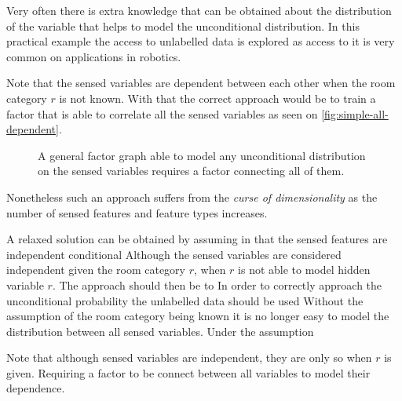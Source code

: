 Very often there is extra knowledge that can be obtained about the distribution
of the variable that helps to model the unconditional distribution.
In this practical example the access to unlabelled data is explored as access to
it is very common on applications in robotics.

Note that the sensed variables are dependent between each other when the room
category $r$ is not known. With that the correct approach would be to train a
factor that is able to correlate all the sensed variables as seen on
\autoref{fig:simple-all-dependent}.

\begin{figure}[h]
\centering
{}
\caption{\label{fig:simple-all-dependent}A general factor graph able
         to model any unconditional distribution on the sensed variables
         requires a factor connecting all of them.}
\end{figure}

Nonetheless such an approach suffers from
the \emph{curse of dimensionality} as the number of sensed features and feature
types increases.

A relaxed solution can be obtained by assuming in that the sensed features are
independent conditional 
Although the sensed variables are considered independent given the room category
$r$, when $r$ is not able to model  hidden
variable $r$. The approach should then be to 
In order to correctly approach the unconditional probability the unlabelled
data should be used 
Without the assumption of the room category being known it is no longer easy
to model the distribution between all sensed variables.
Under the assumption 

Note that although sensed variables are independent, they are only so when $r$
is given. Requiring a factor to be connect between all variables to model their
dependence.

